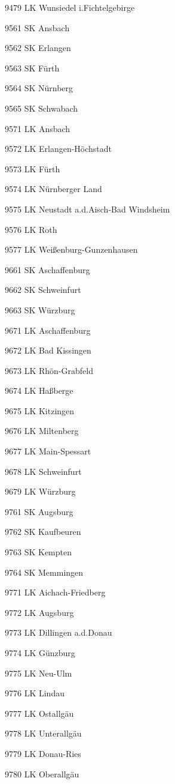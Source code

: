 9479  LK Wunsiedel i.Fichtelgebirge

9561  SK Ansbach

9562  SK Erlangen

9563  SK Fürth

9564  SK Nürnberg

9565  SK Schwabach

9571  LK Ansbach

9572  LK Erlangen-Höchstadt

9573  LK Fürth

9574  LK Nürnberger Land

9575  LK Neustadt a.d.Aisch-Bad Windsheim

9576  LK Roth

9577  LK Weißenburg-Gunzenhausen

9661  SK Aschaffenburg

9662  SK Schweinfurt

9663  SK Würzburg

9671  LK Aschaffenburg

9672  LK Bad Kissingen

9673  LK Rhön-Grabfeld

9674  LK Haßberge

9675  LK Kitzingen

9676  LK Miltenberg

9677  LK Main-Spessart

9678  LK Schweinfurt

9679  LK Würzburg

9761  SK Augsburg

9762  SK Kaufbeuren

9763  SK Kempten

9764  SK Memmingen

9771  LK Aichach-Friedberg

9772  LK Augsburg

9773  LK Dillingen a.d.Donau

9774  LK Günzburg

9775  LK Neu-Ulm

9776  LK Lindau

9777  LK Ostallgäu

9778  LK Unterallgäu

9779  LK Donau-Ries

9780  LK Oberallgäu

